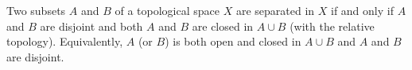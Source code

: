 Two subsets $A$ and $B$ of a topological space $X$ are separated in $X$ if and only if $A$ and $B$ are disjoint and both $A$ and $B$ are closed in $A \cup B$ (with the relative topology). Equivalently, $A$ (or $B$) is both open and closed in $A \cup B$ and $A$ and $B$ are disjoint.

